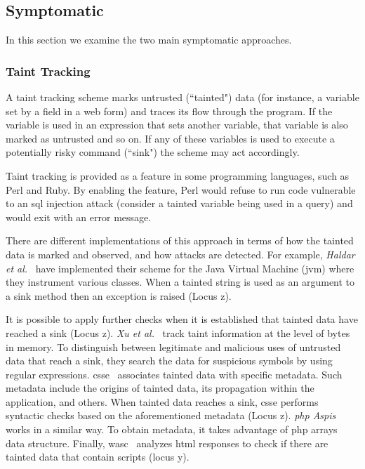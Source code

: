 \documentclass[conference]{IEEEtran}
\begin{document}
\subsection{Symptomatic}

In this section we examine the two main symptomatic
approaches.

\subsubsection{Taint Tracking}
\label{sec:taint}

A taint tracking scheme marks untrusted
(``tainted") data (for instance, a variable set
by a field in a web form) and traces its flow through
the program. If the variable is used in an expression
that sets another variable, that variable is also
marked as untrusted and so on. If any of these variables
is used to execute a potentially risky command (``sink") the
scheme may act accordingly.

Taint tracking is provided as a feature in some programming languages,
such as Perl and Ruby. By enabling the feature, Perl would refuse to
run code vulnerable to an {\sc sql} injection attack (consider a
tainted variable being used in a query) and would exit with an error
message.

There are different implementations of this approach
in terms of how the tainted data is marked and observed,
and how attacks are detected.
For example, {\it Haldar et al.}~\cite{HCF05} have implemented
their scheme for the Java Virtual Machine ({\sc jvm})
where they instrument various classes. When a
tainted string is used as an argument to a sink method
then an exception is raised (Locus {\sc z}).

It is possible to apply further checks when it is established that
tainted data have reached a sink (Locus {\sc z}). {\it Xu et
  al.}~\cite{XBS06} track taint information at the level of bytes in
memory. To distinguish between legitimate and malicious uses of
untrusted data that reach a sink, they search the data for suspicious
symbols by using regular expressions. {\sc csse}~\cite{PB05}
associates tainted data with specific metadata. Such metadata include
the origins of tainted data, its propagation within the application,
and others. When tainted data reaches a sink, {\sc csse} performs
syntactic checks based on the aforementioned metadata (Locus {\sc z}).
{\it {\sc php} Aspis}~\cite{PMP11} works in a similar way. To obtain
metadata, it takes advantage of {\sc php} arrays data structure.
Finally, {\sc wasc}~\cite{NLC07} analyzes {\sc html} responses to check
if there are tainted data that contain scripts (locus {\sc y}).
\end{document}
